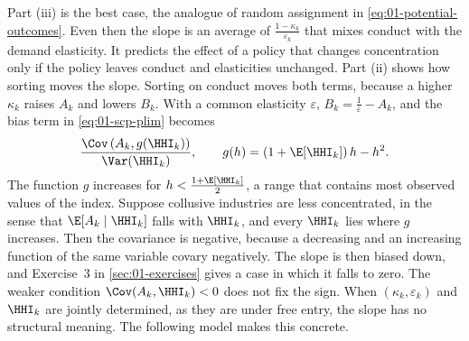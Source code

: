 Part (iii) is the best case, the analogue of random assignment in \eqref{eq:01-potential-outcomes}. Even
then the slope is an average of $\frac{1 - \kappa_k}{\varepsilon_k}$ that mixes conduct with the demand
elasticity. It predicts the effect of a policy that changes concentration only if the policy leaves
conduct and elasticities unchanged. Part (ii) shows how sorting moves the slope. Sorting on conduct moves
both terms, because a higher $\kappa_k$ raises $A_k$ and lowers $B_k$. With a common elasticity
$\varepsilon$, $B_k = \frac{1}{\varepsilon} - A_k$, and the bias term in \eqref{eq:01-scp-plim} becomes
\[
\frac{\Cov\left(A_k, g(\HHI_k)\right)}{\Var(\HHI_k)}, \qquad g(h) = (1 + \E[\HHI_k])\,h - h^2 .
\]
The function $g$ increases for $h < \frac{1 + \E[\HHI_k]}{2}$, a range that contains most observed values of
the index. Suppose collusive industries are less concentrated, in the sense that $\E[A_k \mid \HHI_k]$ falls
with $\HHI_k$, and every $\HHI_k$ lies where $g$ increases. Then the covariance is negative, because a
decreasing and an increasing function of the same variable covary negatively. The slope is then biased down,
and Exercise~3 in \cref{sec:01-exercises} gives a case in which it falls to zero. The weaker condition
$\Cov(A_k, \HHI_k) < 0$ does not fix the sign. When $(\kappa_k, \varepsilon_k)$ and $\HHI_k$ are jointly
determined, as they are under free entry, the slope has no structural meaning. The following model makes this
concrete.


